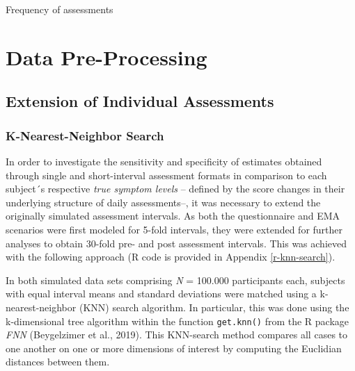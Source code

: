 \documentclass[12pt,twoside]{reedthesis}
\begin{document}
Frequency of assessments

\hypertarget{data-pre-processing}{%
\section{Data Pre-Processing}\label{data-pre-processing}}

\hypertarget{extension-of-individual-assessments}{%
\subsection{Extension of Individual Assessments}\label{extension-of-individual-assessments}}

\hypertarget{k-nearest-neighbor-search}{%
\subsubsection{K-Nearest-Neighbor Search}\label{k-nearest-neighbor-search}}

In order to investigate the sensitivity and specificity of estimates obtained through single and short-interval assessment formats in comparison to each subject´s respective \emph{true symptom levels} -- defined by the score changes in their underlying structure of daily assessments--, it was necessary to extend the originally simulated assessment intervals. As both the questionnaire and EMA scenarios were first modeled for 5-fold intervals, they were extended for further analyses to obtain 30-fold pre- and post assessment intervals. This was achieved with the following approach (R code is provided in Appendix \ref{r-knn-search}).

\par

In both simulated data sets comprising \emph{N} = 100.000 participants each, subjects with equal interval means and standard deviations were matched using a k-nearest-neighbor (KNN) search algorithm. In particular, this was done using the k-dimensional tree algorithm within the function \texttt{get.knn()} from the R package \emph{FNN} (Beygelzimer et al., 2019). This KNN-search method compares all cases to one another on one or more dimensions of interest by computing the Euclidian distances between them.

\par
\end{document}
